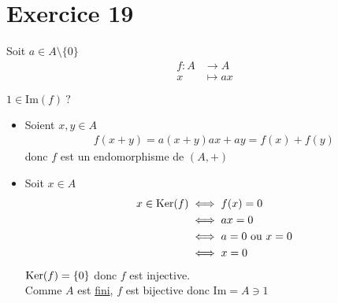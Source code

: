 \part{Exercice 19}

Soit $a \in A\setminus \{0\}$ 
\begin{align*}
	f: A &\longrightarrow A \\
	x &\longmapsto ax
\end{align*}

$1 \in \mathrm{Im}(f)~ ?$\\
\begin{itemize}
	\item Soient $x,y \in A$ \\
		\begin{align*}
			f(x+y) = a(x+y)  ax + ay = f(x) + f(y)
		\end{align*}
		donc $f$ est un endomorphisme de $(A,+)$
	\item Soit $x \in A$ \\
		\begin{align*}
			x \in \operatorname{Ker}(f) &\iff f(x) = 0\\
										&\iff ax = 0\\
										&\iff a = 0 \text{ ou } x = 0\\
										&\iff x = 0
		\end{align*}
		$\operatorname{Ker}(f) = \{0\}$ donc $f$ est injective.\\
		Comme $A$ est \underline{fini}, $f$ est bijective donc $\mathrm{Im} = A \ni 1$
\end{itemize}
